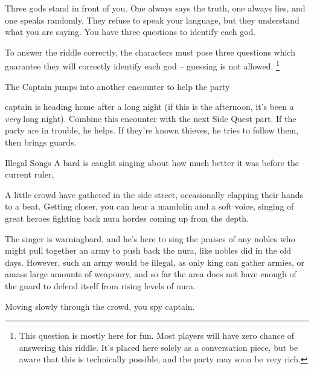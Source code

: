 \begin{multicols}{2}
\begin{boxtext}
Three gods stand in front of you.  One always says the truth, one always lies, and one speaks randomly.  They refuse to speak your language, but they understand what you are saying.  You have three questions to identify each god.
\end{boxtext}

To answer the riddle correctly, the characters must pose three questions which guarantee they will correctly identify each god -- guessing is not allowed.
\footnote{This question is mostly here for fun.  Most players will have zero chance of answering this riddle.
It's placed here solely as a conversation piece, but be aware that this is technically possible, and the party may soon be very rich.}

{\squash The Captain}%
{ jumps into another encounter to help the party}%

\Gls{captain} is heading home after a long night (if this is the afternoon, it's been a \emph{very} long night).
Combine this encounter with the next Side Quest part.
If the party are in trouble, he helps.
If they're known thieves, he tries to follow them, then brings guards.

\captain

{Illegal Songs}%
{A bard is caught singing about how much better it was before the current ruler, }%

\begin{boxtext}
  A little crowd have gathered in the side street, occasionally clapping their hands to a beat.
  Getting closer, you can hear a mandolin and a soft voice, singing of great heroes fighting back nura hordes coming up from the depth.
\end{boxtext}

The singer is \gls{warningbard}, and he's here to sing the praises of any nobles who might pull together an army to push back the nura, like nobles did in the old days.
However, such an army would be illegal, as only \gls{king} can gather armies, or amass large amounts of weaponry, and so far the area does not have enough of the \gls{guard} to defend itself from rising levels of nura.

\begin{boxtext}

  Moving slowly through the crowd, you spy \gls{captain}.

\end{boxtext}


\end{multicols}
